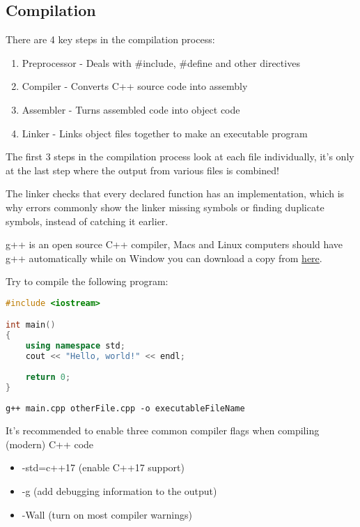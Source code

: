 \documentclass[12pt]{article}
\begin{document}
\subsection{Compilation}

There are 4 key steps in the compilation process:
\begin{enumerate}
    \item Preprocessor - Deals with \#include, \#define and other directives
    \item Compiler - Converts C++ source code into assembly
    \item Assembler - Turns assembled code into object code
    \item Linker - Links object files together to make an executable program
\end{enumerate}

\begin{note}
The first 3 steps in the compilation process look at each file individually, it's only at the last step where the output from various files is combined!
\end{note}

The linker checks that every declared function has an implementation, which is why errors commonly show the linker missing symbols or finding duplicate symbols, instead of catching it earlier.

\begin{minipage}{\linewidth}
\begin{exercise}
g++ is an open source C++ compiler, Macs and Linux computers should have g++ automatically while on Window you can download a copy from \href{https://www.cs.odu.edu/~zeil/cs250PreTest/latest/Public/installingACompiler/#installing-the-cygwin-compiler}{here}.

Try to compile the following program:
\begin{lstlisting}[language=C++]
#include <iostream>

int main()
{
    using namespace std;
    cout << "Hello, world!" << endl;
    
    return 0;
}
\end{lstlisting}

\begin{lstlisting}[numbers=none, caption=How to compile a C++ program]
    g++ main.cpp otherFile.cpp -o executableFileName
\end{lstlisting}

It's recommended to enable three common compiler flags when compiling (modern) C++ code
\begin{itemize}
    \item -std=c++17 (enable C++17 support)
    \item -g (add debugging information to the output)
    \item -Wall (turn on most compiler warnings)
\end{itemize}
\end{exercise}
\end{minipage}

\end{document}
